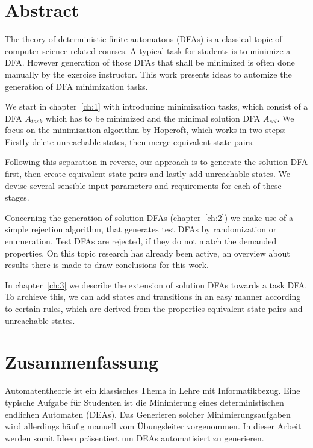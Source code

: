 
\chapter{Abstract}

The theory of deterministic finite automatons (DFAs) is a classical topic of computer science-related courses. A typical task for students is to minimize a DFA. However generation of those DFAs that shall be minimized is often done manually by the exercise instructor. This work presents ideas to automize the generation of DFA minimization tasks.

We start in chapter~\ref{ch:1} with introducing minimization tasks, which consist of a DFA $A_{task}$ which has to be minimized and the minimal solution DFA $A_{sol}$. We focus on the minimization algorithm by Hopcroft, which works in two steps: Firstly delete unreachable states, then merge equivalent state pairs.

Following this separation in reverse, our approach is to generate the solution DFA first, then create equivalent state pairs and lastly add unreachable states. We devise several sensible input parameters and requirements for each of these stages.

Concerning the generation of solution DFAs (chapter~\ref{ch:2}) we make use of a simple rejection algorithm, that generates test DFAs by randomization or enumeration. Test DFAs are rejected, if they do not match the demanded properties. On this topic research has already been active, an overview about results there is made to draw conclusions for this work.

In chapter~\ref{ch:3} we describe the extension of solution DFAs towards a task DFA. To archieve this, we can add states and transitions in an easy manner according to certain rules, which are derived from the properties equivalent state pairs and unreachable states.



\chapter{Zusammenfassung}

Automatentheorie ist ein klassisches Thema in Lehre mit Informatikbezug. Eine typische Aufgabe für Studenten ist die Minimierung eines deterministischen endlichen Automaten (DEAs). Das Generieren solcher Minimierungsaufgaben wird allerdings häufig manuell vom Übungsleiter vorgenommen. In dieser Arbeit werden somit Ideen präsentiert um DEAs automatisiert zu generieren.


